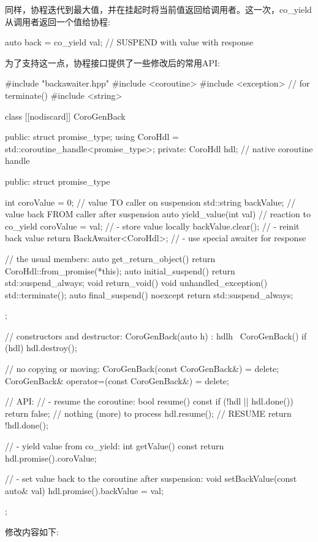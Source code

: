 同样，协程迭代到最大值，并在挂起时将当前值返回给调用者。这一次，co\_yield从调用者返回一个值给协程:

\begin{cpp}
auto back = co_yield val; // SUSPEND with value with response
\end{cpp}

为了支持这一点，协程接口提供了一些修改后的常用API:


\begin{cpp}
#include "backawaiter.hpp"
#include <coroutine>
#include <exception> // for terminate()
#include <string>

class [[nodiscard]] CoroGenBack {
public:
	struct promise_type;
	using CoroHdl = std::coroutine_handle<promise_type>;
private:
	CoroHdl hdl; // native coroutine handle

public:
	struct promise_type {
		int coroValue = 0; // value TO caller on suspension
		std::string backValue; // value back FROM caller after suspension
		auto yield_value(int val) { // reaction to co_yield
			coroValue = val; // - store value locally
			backValue.clear(); // - reinit back value
			return BackAwaiter<CoroHdl>{}; // - use special awaiter for response
		}

		// the usual members:
		auto get_return_object() { return CoroHdl::from_promise(*this); }
		auto initial_suspend() { return std::suspend_always{}; }
		void return_void() { }
		void unhandled_exception() { std::terminate(); }
		auto final_suspend() noexcept { return std::suspend_always{}; }
	};

	// constructors and destructor:
	CoroGenBack(auto h) : hdl{h} { }
	~CoroGenBack() { if (hdl) hdl.destroy(); }

	// no copying or moving:
	CoroGenBack(const CoroGenBack&) = delete;
	CoroGenBack& operator=(const CoroGenBack&) = delete;

	// API:
	// - resume the coroutine:
	bool resume() const {
	if (!hdl || hdl.done()) {
		return false; // nothing (more) to process
	}
	hdl.resume(); // RESUME
	return !hdl.done();
	}

	// - yield value from co_yield:
	int getValue() const {
		return hdl.promise().coroValue;
	}

	// - set value back to the coroutine after suspension:
	void setBackValue(const auto& val) {
		hdl.promise().backValue = val;
	}
};
\end{cpp}

修改内容如下:

